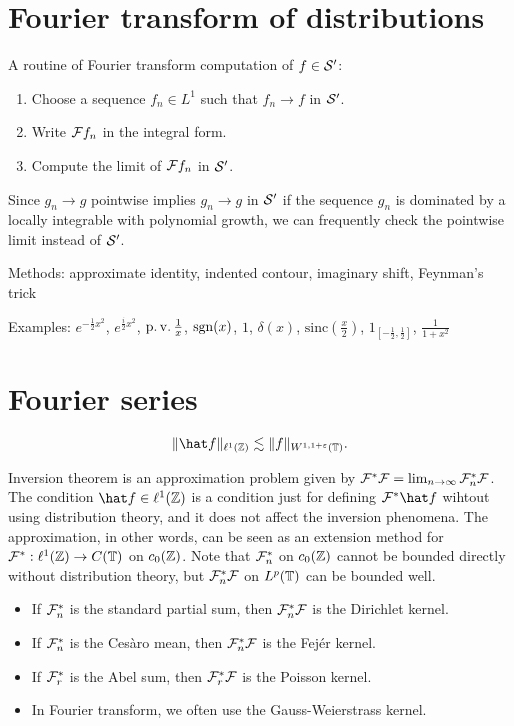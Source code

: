 \documentclass{../../large}
\begin{document}
\section{Fourier transform of distributions}
A routine of Fourier transform computation of $f\in\mathcal{S}'$:
\begin{enumerate}
\item Choose a sequence $f_n\in L^1$ such that $f_n\to f$ in $\mathcal{S}'$.
\item Write $\mathcal{F} f_n$ in the integral form.
\item Compute the limit of $\mathcal{F} f_n$ in $\mathcal{S}'$.
\end{enumerate}
Since $g_n\to g$ pointwise implies $g_n\to g$ in $\mathcal{S}'$ if the sequence $g_n$ is dominated by a locally integrable with polynomial growth, we can frequently check the pointwise limit instead of $\mathcal{S}'$.

Methods: approximate identity, indented contour, imaginary shift, Feynman's trick

Examples: $e^{-\frac12x^2}$, $e^{\frac i2x^2}$, $\operatorname{p.v.}\frac1x$, $\operatorname{sgn}(x)$, $1$, $\delta(x)$, $\mathrm{sinc}(\frac x2)$, $1_{[-\frac12,\frac12]}$, $\frac1{1+x^2}$






\section{Fourier series}
\begin{prb}
\[\|\hat f\|_{\ell^1(\Z)}\lesssim\|f\|_{W^{1,1+\e}(\T)}.\]
\end{prb}

Inversion theorem is an approximation problem given by $\mathcal{F}^*\mathcal{F}=\lim_{n\to\infty}\mathcal{F}_n^*\mathcal{F}$.
The condition $\hat f\in\ell^1(\Z)$ is a condition just for defining $\cF^*\hat f$ wihtout using distribution theory, and it does not affect the inversion phenomena.
The approximation, in other words, can be seen as an extension method for $\mathcal{F}^*:\ell^1(\mathbb{Z})\to C(\mathbb{T})$ on $c_0(\mathbb{Z})$.
Note that $\mathcal{F}_n^*$ on $c_0(\mathbb{Z})$ cannot be bounded directly without distribution theory, but $\mathcal{F}_n^*\mathcal{F}$ on $L^p(\mathbb{T})$ can be bounded well.

\begin{itemize}
\item If $\mathcal{F}_n^*$ is the standard partial sum, then $\mathcal{F}_n^*\mathcal{F}$ is the Dirichlet kernel.
\item If $\mathcal{F}_n^*$ is the Ces\`aro mean, then $\mathcal{F}_n^*\mathcal{F}$ is the Fej\'er kernel.
\item If $\mathcal{F}_r^*$ is the Abel sum, then $\mathcal{F}_r^*\mathcal{F}$ is the Poisson kernel.
\item In Fourier transform, we often use the Gauss-Weierstrass kernel.
\end{itemize}
\end{document}

